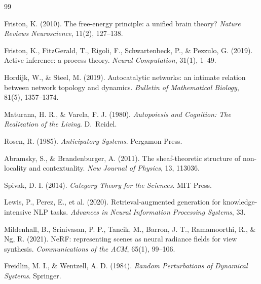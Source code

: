 \documentclass[12pt, oneside]{article}
\begin{document}
\newpage

\begin{thebibliography}{99}

Friston, K. (2010).
The free-energy principle: a unified brain theory?
\textit{Nature Reviews Neuroscience}, 11(2), 127--138.

Friston, K., FitzGerald, T., Rigoli, F., Schwartenbeck, P., \& Pezzulo, G. (2019).
Active inference: a process theory.
\textit{Neural Computation}, 31(1), 1--49.

Hordijk, W., \& Steel, M. (2019).
Autocatalytic networks: an intimate relation between network topology and dynamics.
\textit{Bulletin of Mathematical Biology}, 81(5), 1357--1374.

Maturana, H. R., \& Varela, F. J. (1980).
\textit{Autopoiesis and Cognition: The Realization of the Living}.
D.~Reidel.

Rosen, R. (1985).
\textit{Anticipatory Systems}.
Pergamon Press.

Abramsky, S., \& Brandenburger, A. (2011).
The sheaf-theoretic structure of non-locality and contextuality.
\textit{New Journal of Physics}, 13, 113036.

Spivak, D. I. (2014).
\textit{Category Theory for the Sciences}.
MIT Press.

Lewis, P., Perez, E., et al. (2020).
Retrieval-augmented generation for knowledge-intensive NLP tasks.
\textit{Advances in Neural Information Processing Systems}, 33.

Mildenhall, B., Srinivasan, P. P., Tancik, M., Barron, J. T., Ramamoorthi, R.,
\& Ng, R. (2021).
NeRF: representing scenes as neural radiance fields for view synthesis.
\textit{Communications of the ACM}, 65(1), 99--106.

Freidlin, M. I., \& Wentzell, A. D. (1984).
\textit{Random Perturbations of Dynamical Systems}.
Springer.

\end{thebibliography}
\end{document}
